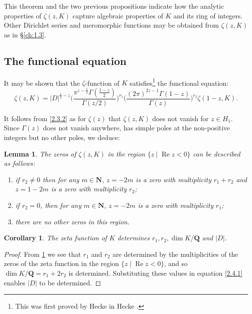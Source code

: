 \documentclass[10pt,leqno]{article}
\newtheorem{lemm}[theo]{Lemma}
\newtheorem{coro}[theo]{Corollary}
\theoremstyle{definition}
\def\NN{\mathbf{N}}
\def\QQ{\mathbf{Q}}
\DeclareMathOperator{\re}{Re}
\def\fnonni{This was first proved by Hecke in Hecke \cite{bib:94}.}
\begin{document}
This theorem and the two previous propositions indicate how the analytic properties of $\zeta(z,K)$ capture algebraic properties of $K$ and its ring of integers.
Other Dirichlet series and meromorphic functions may be obtained from $\zeta(z,K)$ as in \S\ref{ch:1.3}.


\subsection{The functional equation}
\label{ch:2.4}

It may be shown that the $\zeta$-function of $K$ satisfies\footnote{\fnonni} the functional equation:
\begin{equation}
\label{2.4.1}
\zeta(z,K)
= |D|^{\frac12 - z}
\biggl(
\frac{\pi^{z-\frac12} \Gamma(\frac{1-z}2)}{\Gamma(z/2)}
\biggr)^{\!r_1}
\!\!
\biggl(
\frac{(2\pi)^{2z-1} \Gamma(1-z)}{\Gamma(z)}
\biggr)^{\!r_2}
\!\!
\zeta(1-z, K).
\end{equation}

It follows from \ref{2.3.2} as for $\zeta(z)$ that $\zeta(z,K)$ does not vanish for $z \in H_1$.
Since $\Gamma(z)$ does not vanish anywhere, has simple poles at the non-positive integers but no other poles, we deduce:

\begin{lemm}
\label{2.4.2}
The zeros of $\zeta(z,K)$ in the region $\{z \mid \re z < 0 \}$ can be described as follows:
\begin{enumerate}
\item
if $r_2\not=0$ then for any $m \in \NN$, $z = -2m$ is a zero with multiplicity $r_1 + r_2$ and $z = 1-2m$ is a zero with multiplicity $r_2$;

\item
if $r_2 = 0$, then for any $m \in \NN$, $z = -2m$ is a zero with multiplicity $r_1$;

\item
there are no other zeros in this region.
\end{enumerate}
\end{lemm}



\begin{coro}
\label{2.4.3}
The zeta function of $K$ determines $r_1, r_2, \dim K/\QQ$ and $|D|$.
\end{coro}

\begin{proof}
From \ref{2.4.2} we see that $r_1$ and $r_2$ are determined by the multiplicities of the zeros of the zeta function in the region $\{ z \mid \re z < 0 \}$, and so $\dim K/\QQ = r_1 + 2r_2$ is determined.
Substituting these values in equation \eqref{2.4.1} enables $|D|$ to be determined.
\end{proof}
\end{document}
